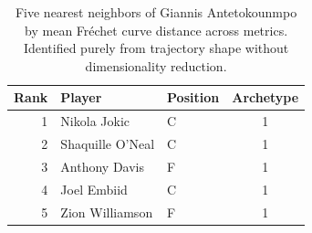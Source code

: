 \begin{table}[htbp]
  \centering\small
  \begin{tabular}{rllc}
    \toprule
    Rank & Player & Position & Archetype \\
    \midrule
    1 & Nikola Jokic & C & 1 \\
    2 & Shaquille O'Neal & C & 1 \\
    3 & Anthony Davis & F & 1 \\
    4 & Joel Embiid & C & 1 \\
    5 & Zion Williamson & F & 1 \\
    \bottomrule
  \end{tabular}
  \caption{Five nearest neighbors of Giannis Antetokounmpo by mean Fr\'{e}chet curve distance across metrics. Identified purely from trajectory shape without dimensionality reduction.}
  \label{tab:Giannis_Antetokounmpo_frechet_curve_neighbors}
\end{table}

